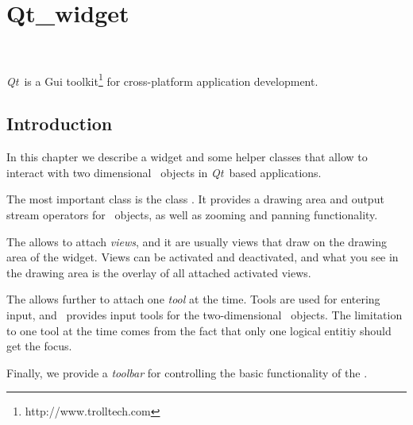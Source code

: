 
\newcommand{\qt}{{\em Qt}}      %

\gdef\lciIfHtmlClassLinks{\lcFalse}
\gdef\lciIfHtmlRefLinks{\lcFalse}
\gdef\lciIfHtmlLinks{\lcFalse}

\chapter{Qt\_widget}
\label{chapterQtwidget}

\\

\qt\ is a {\sc Gui} toolkit\footnote{http://www.trolltech.com} for
cross-platform application development. 

\section{Introduction}

In this chapter we describe a widget and some helper classes that
allow to interact with two dimensional \cgal\ objects in \qt\ based applications.

The most important class is the class . It provides
a drawing area and output stream operators for \cgal\ objects, as well
as zooming and panning functionality.

The  allows to attach {\em views}, and
it are usually views that draw on the drawing area of the widget.
Views can be activated and deactivated, and what you see in the drawing area
is the overlay of all attached activated views.

The  allows further to attach one {\em tool} at the time. 
Tools are used for entering input, and \cgal\ provides input tools for the
two-dimensional \cgal\ objects. The limitation to one tool at the time comes
from the fact that only one logical entitiy should get the focus.

Finally, we provide a {\em toolbar} for controlling the basic functionality
of the .

